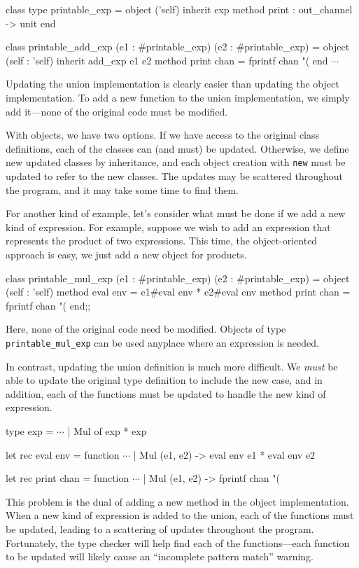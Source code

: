\begin{ocaml}
class type printable_exp =
  object ('self)
    inherit exp
    method print : out_channel -> unit
  end

class printable_add_exp
  (e1 : #printable_exp) (e2 : #printable_exp) =
  object (self : 'self)
    inherit add_exp e1 e2
    method print chan =
      fprintf chan "(%
  end
$\cdots$
\end{ocaml}
%
Updating the union implementation is clearly easier than updating the
object implementation.  To add a new function to the union
implementation, we simply add it---none of the original code must be
modified.

With objects, we have two options.  If we have access to the original
class definitions, each of the classes can (and must) be updated.
Otherwise, we define new updated classes by inheritance, and each
object creation with \hbox{\lstinline$new$} must be updated to refer to the
new classes.  The updates may be scattered throughout the program, and
it may take some time to find them.


For another kind of example, let's consider what must be done if we
add a new kind of expression.  For example, suppose we wish to add an
expression that represents the product of two expressions.  This time,
the object-oriented approach is easy, we just add a new object for products.

\begin{ocaml}
class printable_mul_exp (e1 : #printable_exp) (e2 : #printable_exp) =
  object (self : 'self)
    method eval env = e1#eval env * e2#eval env
    method print chan = fprintf chan "(%
  end;;
\end{ocaml}
%
Here, none of the original code need be modified.  Objects of
type \hbox{\lstinline$printable_mul_exp$} can be used anyplace where an
expression is needed.

In contrast, updating the union definition is much more difficult.
We \emph{must} be able to update the original type definition to
include the new case, and in addition, each of the functions
must be updated to handle the new kind of expression.

\begin{ocaml}
type exp =
   $\cdots$
 | Mul of exp * exp

let rec eval env = function
   $\cdots$
 | Mul (e1, e2) ->
     eval env e1 * eval env e2

let rec print chan = function
   $\cdots$
 | Mul (e1, e2) ->
     fprintf chan "(%
\end{ocaml}
%
This problem is the dual of adding a new method in
the object implementation.  When a new kind of expression is added to
the union, each of the functions must be updated, leading to a
scattering of updates throughout the program.  Fortunately, the type
checker will help find each of the functions---each function to be
updated will likely cause an ``incomplete pattern match'' warning.

